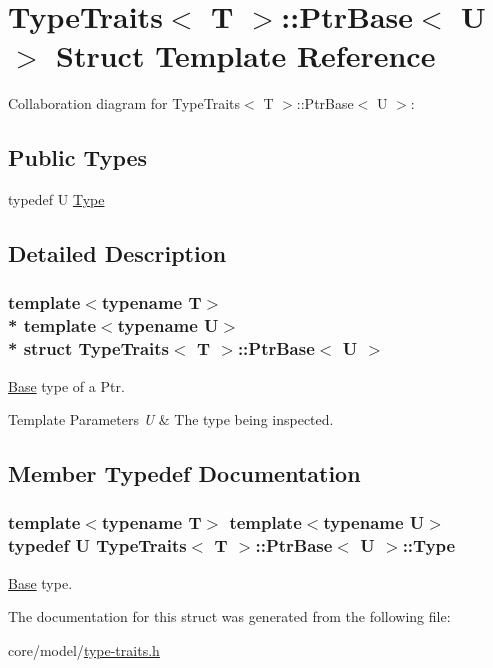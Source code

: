 \hypertarget{structTypeTraits_1_1PtrBase}{}\section{Type\+Traits$<$ T $>$\+:\+:Ptr\+Base$<$ U $>$ Struct Template Reference}
\label{structTypeTraits_1_1PtrBase}


Collaboration diagram for Type\+Traits$<$ T $>$\+:\+:Ptr\+Base$<$ U $>$\+:
\subsection*{Public Types}
\begin{DoxyCompactItemize}
\item 
typedef U \hyperlink{structTypeTraits_1_1PtrBase_ad5c51881a7b74762a55805b753ddf1e7}{Type}
\end{DoxyCompactItemize}


\subsection{Detailed Description}
\subsubsection*{template$<$typename T$>$\\*
template$<$typename U$>$\\*
struct Type\+Traits$<$ T $>$\+::\+Ptr\+Base$<$ U $>$}

\hyperlink{structTypeTraits_1_1Base}{Base} type of a Ptr. 
\begin{DoxyTemplParams}{Template Parameters}
{\em U} & The type being inspected. \\
\hline
\end{DoxyTemplParams}


\subsection{Member Typedef Documentation}
\subsubsection[{\texorpdfstring{Type}{Type}}]{\setlength{\rightskip}{0pt plus 5cm}template$<$typename T$>$ template$<$typename U$>$ typedef U {\bf Type\+Traits}$<$ T $>$\+::{\bf Ptr\+Base}$<$ U $>$\+::{\bf Type}}\hypertarget{structTypeTraits_1_1PtrBase_ad5c51881a7b74762a55805b753ddf1e7}{}\label{structTypeTraits_1_1PtrBase_ad5c51881a7b74762a55805b753ddf1e7}
\hyperlink{structTypeTraits_1_1Base}{Base} type. 

The documentation for this struct was generated from the following file\+:\begin{DoxyCompactItemize}
\item 
core/model/\hyperlink{type-traits_8h}{type-\/traits.\+h}\end{DoxyCompactItemize}
